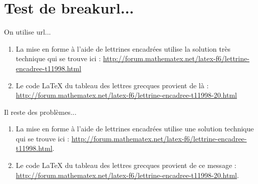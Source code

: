 \documentclass[10pt,a4paper]{article}
\begin{document}
\section*{Test de breakurl...}

On utilise url...

\begin{enumerate}
	\item La mise en forme à l'aide de lettrines encadrées utilise la solution très technique qui se trouve ici : \url{http://forum.mathematex.net/latex-f6/lettrine-encadree-t11998.html}

	\item Le code \LaTeX{} du tableau des lettres grecques provient de là : \url{http://forum.mathematex.net/latex-f6/lettrine-encadree-t11998-20.html}
\end{enumerate}

Il reste des problèmes...

\begin{enumerate}
	\item La mise en forme à l'aide de lettrines encadrées utilise une solution technique qui se trouve ici : \url{http://forum.mathematex.net/latex-f6/lettrine-encadree-t11998.html}.

	\item Le code \LaTeX{} du tableau des lettres grecques provient de ce message : \url{http://forum.mathematex.net/latex-f6/lettrine-encadree-t11998-20.html}.
\end{enumerate}
\end{document}
